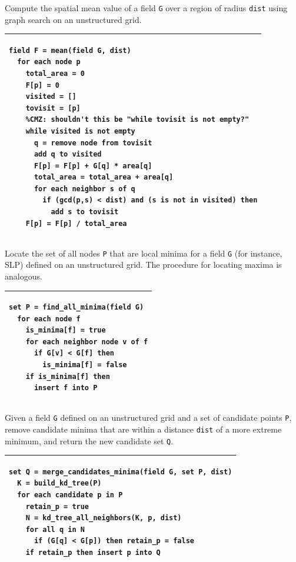 \documentclass[gmdd, hvmath, online]{copernicus_discussions}
\begin{document}

\begin{algorithm}
\caption{Compute the spatial mean value of a field \texttt{G} over a region of radius \texttt{dist} using graph search on an unstructured grid.\ \\} \label{alg:field_mean_value}
\noindent \begin{tabular}{p{5in}}
\hline \small \begin{verbatim}
field F = mean(field G, dist)
  for each node p
    total_area = 0
    F[p] = 0
    visited = []
    tovisit = [p]
    %CMZ: shouldn't this be "while tovisit is not empty?"
    while visited is not empty
      q = remove node from tovisit
      add q to visited
      F[p] = F[p] + G[q] * area[q]
      total_area = total_area + area[q]
      for each neighbor s of q
        if (gcd(p,s) < dist) and (s is not in visited) then
          add s to tovisit
    F[p] = F[p] / total_area
\end{verbatim} \\
\hline
\end{tabular}
\end{algorithm}

\begin{algorithm}
\caption{Locate the set of all nodes \texttt{P} that are local minima for a field \texttt{G} (for instance, SLP) defined on an unstructured grid.  The procedure for locating maxima is analogous.\ \\} \label{alg:find_all_minima}
\noindent \begin{tabular}{p{5in}}
\hline \small \begin{verbatim}
set P = find_all_minima(field G)
  for each node f
    is_minima[f] = true
    for each neighbor node v of f
      if G[v] < G[f] then
        is_minima[f] = false
    if is_minima[f] then
      insert f into P
\end{verbatim} \\
\hline
\end{tabular}
\end{algorithm}

\begin{algorithm}
\caption{Given a field \texttt{G} defined on an unstructured grid and a set of candidate points \texttt{P}, remove candidate minima that are within a distance \texttt{dist} of a more extreme minimum, and return the new candidate set \texttt{Q}.\ \\} \label{alg:merge_candidates_minima}
\noindent \begin{tabular}{p{5in}}
\hline \small \begin{verbatim}
set Q = merge_candidates_minima(field G, set P, dist)
  K = build_kd_tree(P)
  for each candidate p in P
    retain_p = true
    N = kd_tree_all_neighbors(K, p, dist)
    for all q in N
      if (G[q] < G[p]) then retain_p = false
    if retain_p then insert p into Q
\end{verbatim} \\
\hline
\end{tabular}
\end{algorithm}
\end{document}

